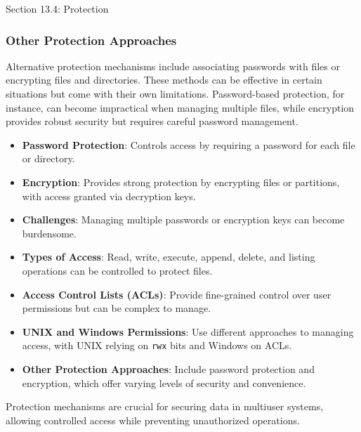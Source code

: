 \begin{notes}{Section 13.4: Protection}
\begin{highlight}
    \end{highlight}
    
    \subsubsection*{Other Protection Approaches}
    
    Alternative protection mechanisms include associating passwords with files or encrypting files and directories. These methods can be effective in certain situations but come with their own limitations. 
    Password-based protection, for instance, can become impractical when managing multiple files, while encryption provides robust security but requires careful password management.
    
    \begin{highlight}
    
        \begin{itemize}
            \item \textbf{Password Protection}: Controls access by requiring a password for each file or directory.
            \item \textbf{Encryption}: Provides strong protection by encrypting files or partitions, with access granted via decryption keys.
            \item \textbf{Challenges}: Managing multiple passwords or encryption keys can become burdensome.
        \end{itemize}
    
    \end{highlight}
    
    \begin{highlight}
    
        \begin{itemize}
            \item \textbf{Types of Access}: Read, write, execute, append, delete, and listing operations can be controlled to protect files.
            \item \textbf{Access Control Lists (ACLs)}: Provide fine-grained control over user permissions but can be complex to manage.
            \item \textbf{UNIX and Windows Permissions}: Use different approaches to managing access, with UNIX relying on \texttt{rwx} bits and Windows on ACLs.
            \item \textbf{Other Protection Approaches}: Include password protection and encryption, which offer varying levels of security and convenience.
        \end{itemize}
    
    Protection mechanisms are crucial for securing data in multiuser systems, allowing controlled access while preventing unauthorized operations.
    
    \end{highlight}
\end{notes}

